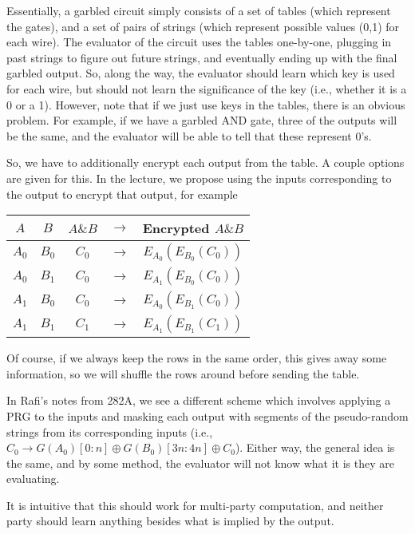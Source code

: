 \documentclass[11pt]{article}
\begin{document}
Essentially, a garbled circuit simply consists of a set of tables (which represent the gates), and a set of pairs of strings (which represent possible values (0,1) for each wire).
The evaluator of the circuit uses the tables one-by-one, plugging in past strings to figure out future strings, and eventually ending up with the final garbled output.
So, along the way, the evaluator should learn which key is used for each wire, but should not learn the significance of the key (i.e., whether it is a 0 or a 1).
However, note that if we just use keys in the tables, there is an obvious problem.
For example, if we have a garbled AND gate, three of the outputs will be the same, and the evaluator will be able to tell that these represent 0's.

So, we have to additionally encrypt each output from the table.
A couple options are given for this.
In the lecture, we propose using the inputs corresponding to the output to encrypt that output, for example
\begin{center}
\begin{tabular}{ c | c | c c c }
$A$ & $B$ & $A\& B$ & $\to$ & Encrypted $A\&B$\\
\hline
$A_0$ & $B_0$ & $C_0$ & $\to$ & $E_{A_0}(E_{B_0}(C_0))$\\
$A_0$ & $B_1$ & $C_0$ & $\to$ & $E_{A_1}(E_{B_0}(C_0))$\\
$A_1$ & $B_0$ & $C_0$ & $\to$ & $E_{A_0}(E_{B_1}(C_0))$\\
$A_1$ & $B_1$ & $C_1$ & $\to$ & $E_{A_1}(E_{B_1}(C_1))$\\
\end{tabular}
\end{center}
Of course, if we always keep the rows in the same order, this gives away some information, so we will shuffle the rows around before sending the table.

In Rafi's notes from 282A, we see a different scheme which involves applying a PRG to the inputs and masking each output with segments of the pseudo-random strings from its corresponding inputs (i.e., \(C_0 \to G(A_0)[0:n]\oplus G(B_0)[3n:4n] \oplus C_0\)).
Either way, the general idea is the same, and by some method, the evaluator will not know what it is they are evaluating.\smallskip

It is intuitive that this should work for multi-party computation, and neither party should learn anything besides what is implied by the output.
\end{document}
